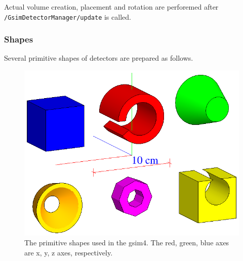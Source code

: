 \documentclass[a4paper,12pt]{article}
\begin{document}
 Actual volume creation, placement and
 rotation are perforemed after \\
 {\tt /GsimDetectorManager/update} is called.

 \subsubsection{Shapes}
 Several primitive shapes of detectors are prepared as follows.
 \begin{figure}[H]
  \begin{center}
   \includegraphics[bb=155 280 430 500,origin=c,scale=1.,clip]{figure/shape.eps}
  \end{center}
  \caption{The primitive shapes used in the gsim4. The red, green, blue
  axes are x, y, z axes, respectively.\label{shape}} 
 \end{figure}
\end{document}
